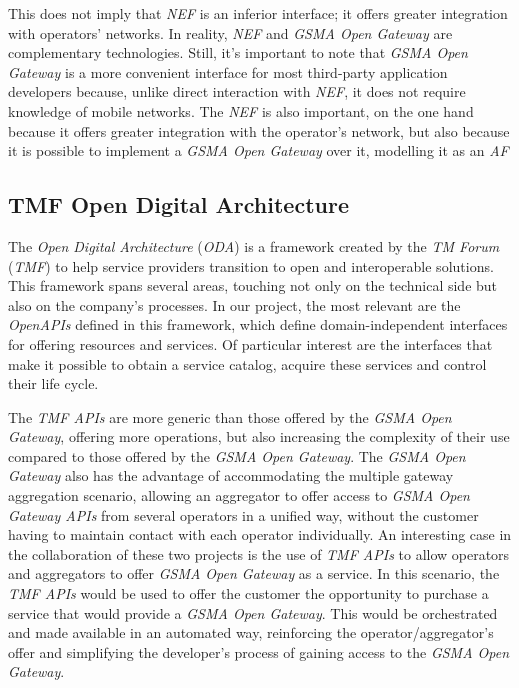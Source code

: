 This does not imply that \emph{NEF} is an inferior interface; it
offers greater integration with operators' networks. In reality,
\emph{NEF} and \emph{GSMA Open Gateway} are complementary
technologies. Still, it's important to note that \emph{GSMA Open
Gateway} is a more convenient interface for most third-party
application developers because, unlike direct interaction with
\emph{NEF},  it does not require knowledge of mobile networks.
The \emph{NEF} is also important, on the one hand because it
offers greater integration with the operator's network, but also
because it is possible to implement a \emph{GSMA Open Gateway}
over it, modelling it as an \emph{AF}

\subsection{TMF Open Digital Architecture}

The \emph{Open Digital Architecture} (\emph{ODA}) is a framework
created by the \emph{TM Forum} (\emph{TMF}) to help service
providers transition to open and interoperable solutions. This
framework spans several areas, touching not only on the technical
side but also on the company's processes. In our project, the
most relevant are the \emph{OpenAPIs} defined in this framework,
which define domain-independent interfaces for offering resources
and services. Of particular interest are the interfaces that make
it possible to obtain a service catalog, acquire these services
and control their life cycle.

The \emph{TMF APIs} are more generic than those offered by the
\emph{GSMA Open Gateway}, offering more operations, but also
increasing the complexity of their use compared to those offered
by the \emph{GSMA Open Gateway}. The \emph{GSMA Open Gateway}
also has the advantage of accommodating the multiple gateway
aggregation scenario, allowing an aggregator to offer access to
\emph{GSMA Open Gateway APIs} from several operators in a unified
way, without the customer having to maintain contact with each
operator individually. An interesting case in the collaboration
of these two projects is the use of \emph{TMF APIs} to allow
operators and aggregators to offer \emph{GSMA Open Gateway} as a
service. In this scenario, the \emph{TMF APIs} would be used to
offer the customer the opportunity to purchase a service that
would provide a \emph{GSMA Open Gateway}. This would be
orchestrated and made available in an automated way, reinforcing
the operator/aggregator's offer and simplifying the developer's
process of gaining access to the \emph{GSMA Open Gateway}.


